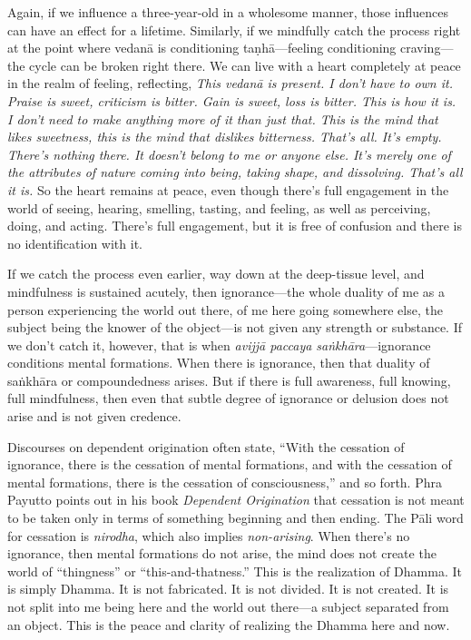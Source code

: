 Again, if we influence a three-year-old in a wholesome manner, those 
influences can have an effect for a lifetime. Similarly, if we 
mindfully catch the process right at the point where vedanā is 
conditioning taṇhā---feeling conditioning craving---the cycle can be 
broken right there. We can live with a heart completely at peace in the 
realm of feeling, reflecting, \emph{This vedanā is present. I don't 
have to own it. Praise is sweet, criticism is bitter. Gain is sweet, 
loss is bitter. This is how it is. I don't need to make anything more 
of it than just that. This is the mind that likes sweetness, this is 
the mind that dislikes bitterness. That's all. It's empty. There's 
nothing there. It doesn't belong to me or anyone else. It's merely one 
of the attributes of nature coming into being, taking shape, and 
dissolving. That's all it is.} So the heart remains at peace, even 
though there's full engagement in the world of seeing, hearing, 
smelling, tasting, and feeling, as well as perceiving, doing, and 
acting. There's full engagement, but it is free of confusion and there 
is no identification with it.

If we catch the process even earlier, way down at the deep-tissue 
level, and mindfulness is sustained acutely, then ignorance---the whole 
duality of me as a person experiencing the world out there, of me here 
going somewhere else, the subject being the knower of the object---is 
not given any strength or substance. If we don't catch it, however, 
that is when \emph{avijjā paccaya saṅkhāra}---ignorance conditions 
mental formations. When there is ignorance, then that duality of 
saṅkhāra or compoundedness arises. But if there is full awareness, 
full knowing, full mindfulness, then even that subtle degree of 
ignorance or delusion does not arise and is not given credence.

Discourses on dependent origination often state, ``With the cessation 
of ignorance, there is the cessation of mental formations, and with the 
cessation of mental formations, there is the cessation of 
consciousness,'' and so forth. Phra Payutto points out in his book 
\emph{Dependent Origination} that cessation is not meant to be taken 
only in terms of something beginning and then ending. The Pāli word 
for cessation is \emph{nirodha}, which also implies \emph{non-arising}. 
When there's no ignorance, then mental formations do not arise, the 
mind does not create the world of ``thingness'' or 
``this-and-thatness.'' This is the realization of Dhamma. It is simply 
Dhamma. It is not fabricated. It is not divided. It is not created. It 
is not split into me being here and the world out there---a subject 
separated from an object. This is the peace and clarity of realizing 
the Dhamma here and now.

